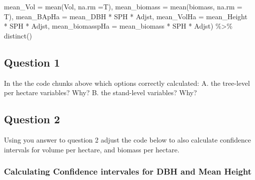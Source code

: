\documentclass[
  letterpaper,
]{book}
\newenvironment{Shaded}{\begin{snugshade}}{\end{snugshade}}
\newcommand{\AttributeTok}[1]{\textcolor[rgb]{0.40,0.45,0.13}{#1}}
\newcommand{\FunctionTok}[1]{\textcolor[rgb]{0.28,0.35,0.67}{#1}}
\newcommand{\NormalTok}[1]{\textcolor[rgb]{0.00,0.23,0.31}{#1}}
\newcommand{\SpecialCharTok}[1]{\textcolor[rgb]{0.37,0.37,0.37}{#1}}
\begin{document}
\begin{Shaded}
\begin{Highlighting}[]
            \AttributeTok{mean\_Vol =} \FunctionTok{mean}\NormalTok{(Vol, }\AttributeTok{na.rm =}\NormalTok{T), }
            \AttributeTok{mean\_biomass =} \FunctionTok{mean}\NormalTok{(biomass, }\AttributeTok{na.rm =}\NormalTok{ T),}
            \AttributeTok{mean\_BApHa =}\NormalTok{ mean\_DBH }\SpecialCharTok{*}\NormalTok{ SPH }\SpecialCharTok{*}\NormalTok{ Adjst, }
            \AttributeTok{mean\_VolHa =}\NormalTok{ mean\_Height }\SpecialCharTok{*}\NormalTok{ SPH }\SpecialCharTok{*}\NormalTok{ Adjst, }
            \AttributeTok{mean\_biomasspHa =}\NormalTok{ mean\_biomass }\SpecialCharTok{*}\NormalTok{ SPH }\SpecialCharTok{*}\NormalTok{ Adjst) }\SpecialCharTok{\%\textgreater{}\%} 
  \FunctionTok{distinct}\NormalTok{()}
\end{Highlighting}
\end{Shaded}

\hypertarget{question-1-3}{%
\subsection{Question 1}\label{question-1-3}}

In the the code chunks above which options correctly calculated: A. the
tree-level per hectare variables? Why? B. the stand-level variables?
Why?

\hypertarget{question-2-3}{%
\subsection{Question 2}\label{question-2-3}}

Using you answer to question 2 adjust the code below to also calculate
confidence intervals for volume per hectare, and biomass per hectare.

\hypertarget{calculating-confidence-intervales-for-dbh-and-mean-height}{%
\subsubsection{Calculating Confidence intervales for DBH and Mean
Height}\label{calculating-confidence-intervales-for-dbh-and-mean-height}}
\end{document}
